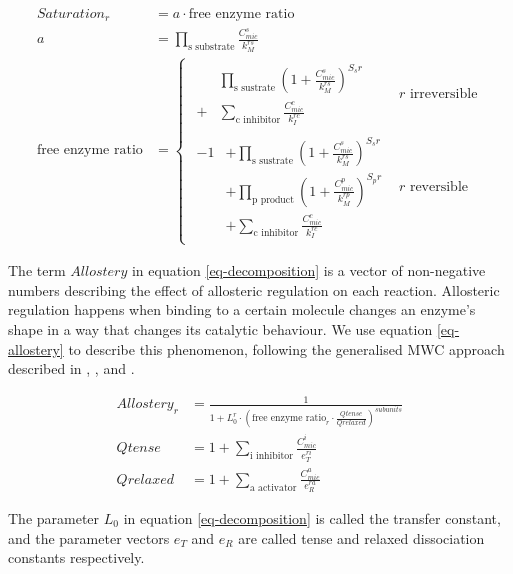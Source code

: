 \documentclass[journal=asbcd6,manuscript=article,layout=traditional]{achemso}
\begin{document}
\begin{align} 
Saturation_r &= a \cdot \text{free enzyme ratio}\label{eq-saturation} \\ 
a &= \prod_{\text{s substrate}}\frac{C_{mic}^s}{k_{M}^{rs}} \nonumber \\ 
\text{free enzyme ratio} &= \begin{cases} \begin{aligned}
  &\prod_{\text{s sustrate}} (1 + \frac{C_{mic}^s}{k_{M}^{rs}})^{S_sr} \\
  + &\sum_{\text{c inhibitor}}\frac{C_{mic}^c}{k_I^{rc}}\end{aligned} & r\text{ irreversible} \\ 
  \begin{aligned}
  -1  &+ \prod_{\text{s sustrate}} (1 + \frac{C_{mic}^s}{k_{M}^{rs}})^{S_sr} \\
      &+ \prod_{\text{p product}} (1 + \frac{C_{mic}^p}{k_{M}^{rp}})^{S_pr} \\ 
      &+ \sum_{\text{c inhibitor}}\frac{C_{mic}^c}{k_I^{rc}} 
  \end{aligned}
    & r\text{ reversible} 
    \end{cases} \nonumber
\end{align}

The term \(Allostery\) in equation \eqref{eq-decomposition} is a vector
of non-negative numbers describing the effect of allosteric regulation
on each reaction. Allosteric regulation happens when binding to a
certain molecule changes an enzyme's shape in a way that changes its
catalytic behaviour. We use equation \eqref{eq-allostery} to describe
this phenomenon, following the generalised MWC approach described in
\citet{monod_nature_1965}, \citet{changeux_2013},
\citet{popova_generalization_1975} and \citet{popova_description_1979}.

\begin{align} 
  Allostery_r &= \frac{1}{1 + L_0^r \cdot (\text{free enzyme ratio}_r \cdot \frac{Qtense}{Qrelaxed})^{subunits}}\label{eq-allostery} \\ 
       Qtense &= 1 + \sum_{\text{i inhibitor}} \frac{C_{mic}^i}{e_T^{ri}}\nonumber \\ 
     Qrelaxed &= 1 + \sum_{\text{a activator}} \frac{C_{mic}^a}{e_R^{ra}}\nonumber
\end{align}

The parameter \(L_0\) in equation \eqref{eq-decomposition} is called the
transfer constant, and the parameter vectors \(e_T\) and \(e_R\) are
called tense and relaxed dissociation constants respectively.
\end{document}

